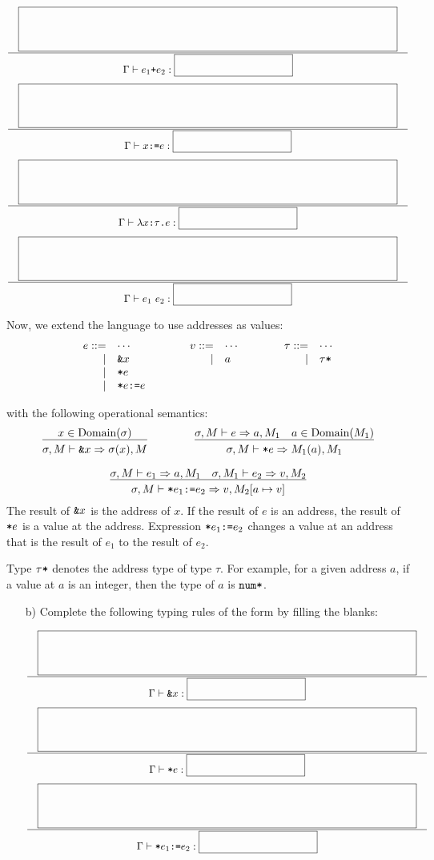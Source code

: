 \begin{enumerate}
\begin{itemize}
{
\[
\newinfrule
{ \lblank }
{ \typed{e_1\code{+}e_2}{\sblank} }
\]
\[
\newinfrule
{ \lblank }
{ \typed{x\code{:=}e}{\sblank} }
\]
\[
\newinfrule
{ \lblank }
{ \typed{\lambda x\code{:}\tau\code{.}e}{\sblank} }
\]
\[
\newinfrule
{ \lblank }
{ \typed{e_1\ e_2}{\sblank} }
\]
}
\end{itemize}

Now, we extend the language to use addresses as values:
\[
\begin{array}{rllrllrll}
e::= & \cdots &\qquad& v::= & \cdots &\qquad& \tau::= & \cdots \\
\mid&\verb+&+x &&\mid& a &&\mid& \tau\verb+*+ \\
\mid&\verb+*+e \\
\mid&\verb+*+e\verb+:=+e \\
\end{array}
\]

with the following operational semantics:
\[
\begin{array}{ccc}
\newinfrule
{ x\in\mbox{Domain}(\sigma) }
{ \sigma,M\vdash \code{\&}x\Rightarrow \sigma(x),M }
&\qquad&
\newinfrule
{ \sigma,M\vdash e\Rightarrow a,M_1 \rulesep
  a\in\mbox{Domain}(M_1) }
{ \sigma,M\vdash \code{*}e\Rightarrow M_1(a),M_1 }
\\[20pt]
\multicolumn{3}{c}{
\newinfrule
{ \sigma,M\vdash e_1\Rightarrow a,M_1 \rulesep
  \sigma,M_1\vdash e_2\Rightarrow v,M_2 }
{ \sigma,M\vdash \code{*}e_1\code{:=}e_2\Rightarrow v,M_2[a\mapsto v] }
}
\end{array}
\]
The result of $\texttt{\&}x$ is the address of $x$.
If the result of $e$ is an address, the result of $\texttt{*}e$ is
a value at the address.
Expression $\texttt{*}e_1\texttt{:=}e_2$ changes a value at an address
that is the result of $e_1$ to the result of $e_2$.

Type $\tau\verb+*+$ denotes the address type of type $\tau$.
For example, for a given address $a$, if a value at $a$ is an integer,
then the type of $a$ is $\verb+num*+$.

\begin{itemize}
\item[b)] Complete the following typing rules of the form
by filling the blanks:

{
\[
\newinfrule
{ \lblank }
{ \typed{\code{\&}x}{\sblank} }
\]
\[
\newinfrule
{ \lblank }
{ \typed{\code{*}e}{\sblank} }
\]
\[
\newinfrule
{ \lblank }
{ \typed{\code{*}e_1\code{:=}e_2}{\sblank} }
\]
}
\end{itemize}


\end{enumerate}
